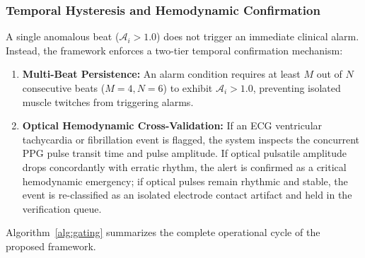 \documentclass{ieeeaccess}
\begin{document}
\subsubsection{Temporal Hysteresis and Hemodynamic Confirmation}
A single anomalous beat ($\mathcal{A}_i > 1.0$) does not trigger an immediate clinical alarm. Instead, the framework enforces a two-tier temporal confirmation mechanism:
\begin{enumerate}
\item \textbf{Multi-Beat Persistence:} An alarm condition requires at least $M$ out of $N$ consecutive beats ($M = 4, N = 6$) to exhibit $\mathcal{A}_i > 1.0$, preventing isolated muscle twitches from triggering alarms.
\item \textbf{Optical Hemodynamic Cross-Validation:} If an ECG ventricular tachycardia or fibrillation event is flagged, the system inspects the concurrent PPG pulse transit time and pulse amplitude. If optical pulsatile amplitude drops concordantly with erratic rhythm, the alert is confirmed as a critical hemodynamic emergency; if optical pulses remain rhythmic and stable, the event is re-classified as an isolated electrode contact artifact and held in the verification queue.
\end{enumerate}

Algorithm~\ref{alg:gating} summarizes the complete operational cycle of the proposed framework.
\end{document}
